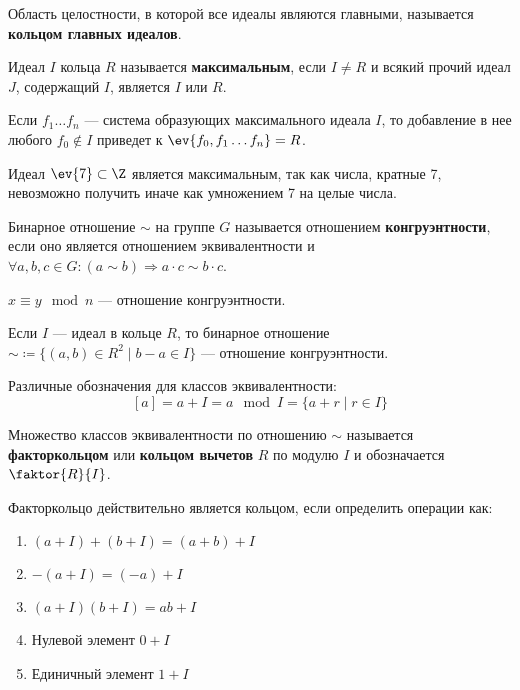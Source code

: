 \begin{definition}
	Область целостности, в которой все идеалы являются главными,
    называется \textbf{кольцом главных идеалов}.
\end{definition}

\begin{definition}
    Идеал \(I\) кольца \(R\) называется \textbf{максимальным}, если
    \(I \neq R\) и всякий прочий идеал \(J\), содержащий \(I\), является \(I\) или \(R\).
\end{definition}

Если \(f_1 \dots f_n\) --- система образующих максимального идеала \(I\),
то добавление в нее любого \(f_0 \notin I\) приведет к \(\ev{f_0, f_1 \dots f_n} = R\).

\begin{example}
    Идеал \(\ev{7} \subset \Z\) является максимальным, так как числа, кратные 7,
    невозможно получить иначе как умножением 7 на целые числа.
\end{example}

\begin{definition}
    Бинарное отношение \(\sim\) на группе \(G\) называется отношением
    \textbf{конгруэнтности}, если оно является отношением эквивалентности
    и \(\forall a,b,c \in G : (a \sim b) \Rightarrow a \cdot c \sim b \cdot c\).
\end{definition}

\begin{example}
    \(x \equiv y \mod n\) --- отношение конгруэнтности.
\end{example}

\begin{example}
    Если \(I\) --- идеал в кольце \(R\), то бинарное отношение
    \(\sim \coloneqq \{(a, b) \in R^2 \mid b - a \in I\}\) --- отношение конгруэнтности.
\end{example}

Различные обозначения для классов эквивалентности:
\[[a] = a + I = a \mod I = \{a + r \mid r \in I\}\]

\begin{definition}
    Множество классов эквивалентности по отношению \(\sim\)
    называется \textbf{факторкольцом} или \textbf{кольцом вычетов}
    \(R\) по модулю \(I\) и обозначается \(\faktor{R}{I}\).
\end{definition}

Факторкольцо действительно является кольцом, если определить операции как:
\begin{enumerate}
    \item \((a + I) + (b + I) = (a + b) + I\)
    \item \( -(a + I) = ( - a) + I\)
    \item \((a + I)(b + I) = ab + I\)
    \item Нулевой элемент \(0 + I\)
    \item Единичный элемент \(1 + I\)
\end{enumerate}

